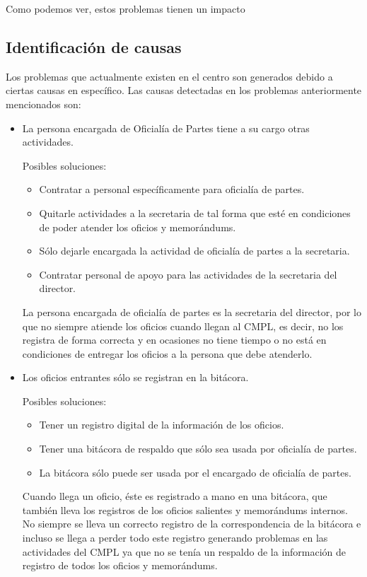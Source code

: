 Como podemos ver, estos problemas tienen un impacto
	\subsection{Identificación de causas}
	Los problemas que actualmente existen en el centro son generados debido a ciertas causas en específico. Las causas detectadas en los problemas anteriormente mencionados son:

\begin{itemize}
	
	\item La persona encargada de Oficialía de Partes tiene a su cargo otras actividades.
	
	Posibles soluciones:
	\begin{itemize}
		\item Contratar a personal específicamente para oficialía de partes.
		\item Quitarle actividades a la secretaria de tal forma que esté en condiciones de poder atender los oficios y memorándums.
		\item Sólo dejarle encargada la actividad de oficialía de partes a la secretaria.
		\item Contratar personal de apoyo para las actividades de la secretaria del director.
	\end{itemize}
	
La persona encargada de oficialía de partes es la secretaria del director, por lo que no siempre atiende los oficios cuando llegan al CMPL, es decir, no los registra de forma correcta y en ocasiones no tiene tiempo o no está en condiciones de entregar los oficios a la persona que debe atenderlo.


	\item Los oficios entrantes sólo se registran en la bitácora.
	
	Posibles soluciones:
	\begin{itemize}
		\item Tener un registro digital de la información de los oficios.
		\item Tener una bitácora de respaldo que sólo sea usada por oficialía de partes.
		\item La bitácora sólo puede ser usada por el encargado de oficialía de partes.
	\end{itemize}	
	
Cuando llega un oficio, éste es registrado a mano en una bitácora, que también lleva los registros de los oficios salientes y memorándums internos. No siempre se lleva un correcto registro de la correspondencia de la bitácora e incluso se llega a perder todo este registro generando problemas en las actividades del CMPL ya que no se tenía un respaldo de la información de registro de todos los oficios y memorándums.


\end{itemize}
